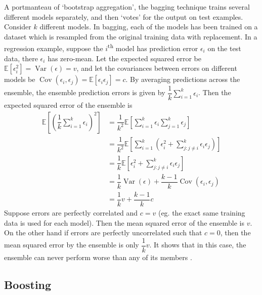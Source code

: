\documentclass[11pt]{report} %
\begin{document}
A portmanteau of `bootstrap aggregation', the bagging technique trains several different models separately, and then `votes' for the output on test examples. Consider $k$ different models. In bagging, each of the models has been trained on a dataset which is resampled from the original training data with replacement. In a regression example, suppose the $i$\textsuperscript{th} model has prediction error $\epsilon_{i}$ on the test data, there $\epsilon_{i}$ has zero-mean. Let the expected squared error be $\mathbb{E}\left[\epsilon_{i}^{2}\right] = \operatorname{Var}\left(\epsilon\right) = v$, and let the covariances between errors on different models be $\operatorname{Cov}\left(\epsilon_{i}, \epsilon_{j}\right) = \mathbb{E}\left[\epsilon_{i}\epsilon_{j}\right] = c$. By averaging predictions across the ensemble, the ensemble prediction errors is given by $\dfrac{1}{k}\sum_{i = 1}^{k}\epsilon_{i}$. Then the expected squared error of the ensemble is
\begin{align}
\mathbb{E}\left[\left(\dfrac{1}{k}\sum_{i = 1}^{k}\epsilon_{i}\right)^{2}\right] &= \dfrac{1}{k^{2}}\mathbb{E}\left[\sum_{i = 1}^{k}\epsilon_{i}\sum_{j = 1}^{k}\epsilon_{j}\right] \\
&= \dfrac{1}{k^{2}}\mathbb{E}\left[\sum_{i = 1}^{k}\left(\epsilon_{i}^{2} + \sum_{j: j\neq i}^{k}\epsilon_{i}\epsilon_{j}\right)\right] \\
&= \dfrac{1}{k}\mathbb{E}\left[\epsilon_{i}^{2} + \sum_{j: j\neq i}^{k}\epsilon_{i}\epsilon_{j}\right] \\
&= \dfrac{1}{k}\operatorname{Var}\left(\epsilon\right) + \dfrac{k-1}{k}\operatorname{Cov}\left(\epsilon_{i}, \epsilon_{j}\right) \\
&= \dfrac{1}{k}v + \dfrac{k - 1}{k}c
\end{align}
Suppose errors are perfectly correlated and $c = v$ (eg. the exact same training data is used for each model). Then the mean squared error of the ensemble is $v$. On the other hand if errors are perfectly uncorrelated such that $c = 0$, then the mean squared error by the ensemble is only $\dfrac{1}{k}v$. It shows that in this case, the ensemble can never perform worse than any of its members \cite{Goodfellow2016}.

\subsection{Boosting}
\end{document}
